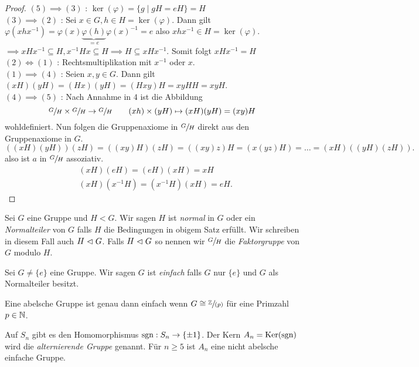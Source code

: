 \begin{proof}
	$(5) \implies (3)$ : $\ker(\varphi) = \{g \mid gH = e H\} = H$ \\
	$(3) \implies (2)$ : Sei $x \in G, h \in H = \ker(\varphi)$.
	Dann gilt $\varphi(x h x^{-1}) = \varphi(x) \underbrace{\varphi(h)}_{= e} \varphi(x)^{-1} = e$ also $x h x^{-1} \in H = \ker(\varphi)$.
	$\implies x H x^{-1} \subseteq H, x^{-1} H x \subseteq H \implies H \subseteq x H x^{-1}$. Somit folgt $x H x^{-1} = H$\\
	$(2) \Leftrightarrow (1)$ : Rechtsmultiplikation mit $x^{-1}$ oder $x$.\\
	$(1) \implies (4)$ : Seien $x,y \in G$. Dann gilt $(xH)(yH) = (Hx)(yH) = (Hxy)H = xy H H = xy H$.\\
	$(4) \implies (5)$ : Nach Annahme in $4$ ist die Abbildung 
	\[
		\sfrac{G}{H} \times \sfrac{G}{H} \to \sfrac{G}{H} \qquad (xh) \times (yH) \mapsto (xH)(yH) = (xy) H
	\]
	wohldefiniert. Nun folgen die Gruppenaxiome in $\sfrac{G}{H}$ direkt aus den Gruppenaxiome in $G$.
	\[
		((xH)(yH)) (zH) = ((xy)H)(zH) = ((xy) z) H = (x(yz)H) = \ldots = (xH)((yH)(zH))
	.\] 
	also ist $a$ in $\sfrac{G}{H}$ assoziativ.
	\begin{align*}
		&(xH)(eH) = (eH)(xH) = xH\\
		&(xH)(x^{-1} H) = (x^{-1} H)(xH) = e H
	.\end{align*}
\end{proof}

\begin{definition}
	Sei $G$ eine Gruppe und $H < G$.
	Wir sagen $H$ ist \emph{normal} in $G$ oder ein \emph{Normalteiler} von $G$ falls $H$ die Bedingungen in obigem Satz erfüllt.
	Wir schreiben in diesem Fall auch $H \vartriangleleft G$.
	Falls $H \vartriangleleft G$ so nennen wir $\sfrac{G}{H}$ die \emph{Faktorgruppe} von $G$ modulo $H$.
\end{definition}

\begin{definition}
	Sei $G \neq \{e\} $ eine Gruppe. Wir sagen $ G$ ist \emph{einfach} falls $G$ nur $\{e\} $ und $G$ als Normalteiler besitzt.
\end{definition}

\begin{eg}
	Eine abelsche Gruppe ist genau dann einfach wenn $G \cong \sfrac{\mathbb{Z}}{(p)}$ für eine Primzahl $p \in \mathbb{N}$.
\end{eg}

\begin{eg}
	Auf $S_{n}$ gibt es den Homomorphismus $\operatorname{sgn}: S_{n} \to \{\pm 1\} $. Der Kern $A_{n} = \operatorname{Ker}(\operatorname{sgn})$ wird die \emph{alternierende Gruppe} genannt.
	Für $n \geq 5$ ist $A_{n}$ eine nicht abelsche einfache Gruppe.
\end{eg}

